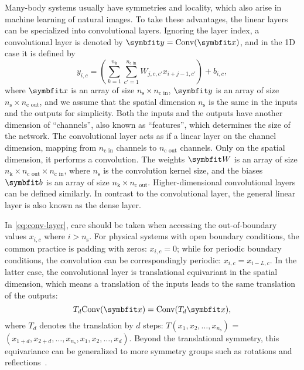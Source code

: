 Many-body systems usually have symmetries and locality, which also arise in machine learning of natural images. To take these advantages, the linear layers can be specialized into convolutional layers. Ignoring the layer index, a convolutional layer is denoted by $\vy = \text{Conv}(\vx)$, and in the 1D case it is defined by
\begin{equation}
y_{i, c} = \left( \sum_{k = 1}^{n_\text{k}} \sum_{c' = 1}^{n_\text{c in}} W_{j, c, c'} x_{i + j - 1, c'} \right) + b_{i, c},
\label{eq:conv-layer}
\end{equation}
where $\vx$ is an array of size $n_\text{s} \times n_\text{c in}$, $\vy$ is an array of size $n_\text{s} \times n_\text{c out}$, and we assume that the spatial dimension $n_\text{s}$ is the same in the inputs and the outputs for simplicity. Both the inputs and the outputs have another dimension of ``channels'', also known as ``features'', which determines the size of the network. The convolutional layer acts as if a linear layer on the channel dimension, mapping from $n_\text{c in}$ channels to $n_\text{c out}$ channels. Only on the spatial dimension, it performs a convolution. The weights $\mW$ is an array of size $n_\text{k} \times n_\text{c out} \times n_\text{c in}$, where $n_\text{s}$ is the convolution kernel size, and the biases $\mb$ is an array of size $n_\text{k} \times n_\text{c out}$. Higher-dimensional convolutional layers can be defined similarly. In contrast to the convolutional layer, the general linear layer is also known as the dense layer.

In \cref{eq:conv-layer}, care should be taken when accessing the out-of-boundary values $x_{i, c}$ where $i > n_\text{s}$. For physical systems with open boundary conditions, the common practice is padding with zeros: $x_{i, c} = 0$; while for periodic boundary conditions, the convolution can be correspondingly periodic: $x_{i, c} = x_{i - L, c}$. In the latter case, the convolutional layer is translational equivariant in the spatial dimension, which means a translation of the inputs leads to the same translation of the outputs:
\begin{equation}
T_d \text{Conv}(\vx) = \text{Conv}(T_d \vx),
\end{equation}
where $T_d$ denotes the translation by $d$ steps: $T (x_1, x_2, \ldots, x_{n_\text{s}})$ = $(x_{1 + d}, x_{2 + d}, \ldots, x_{n_\text{s}}, x_1, x_2, \ldots, x_d)$. Beyond the translational symmetry, this equivariance can be generalized to more symmetry groups such as rotations and reflections~\cite{roth2021group}.

